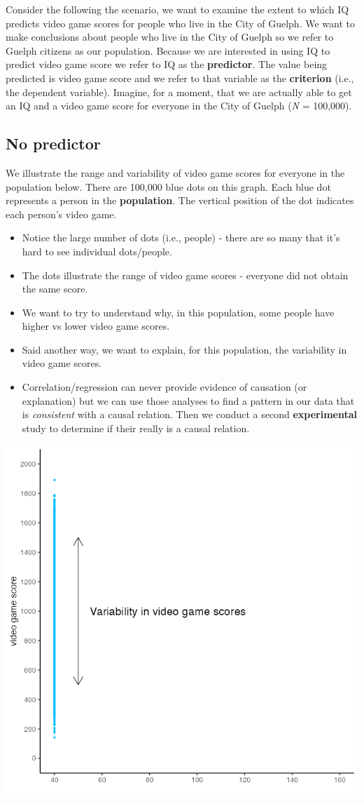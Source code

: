 \documentclass[
]{krantz}
\begin{document}
Consider the following the scenario, we want to examine the extent to which IQ predicts video game scores for people who live in the City of Guelph. We want to make conclusions about people who live in the City of Guelph so we refer to Guelph citizens as our population. Because we are interested in using IQ to predict video game score we refer to IQ as the \textbf{predictor}. The value being predicted is video game score and we refer to that variable as the \textbf{criterion} (i.e., the dependent variable). Imagine, for a moment, that we are actually able to get an IQ and a video game score for everyone in the City of Guelph (\emph{N} = 100,000).

\hypertarget{no-predictor}{%
\subsection{No predictor}\label{no-predictor}}

We illustrate the range and variability of video game scores for everyone in the population below. There are 100,000 blue dots on this graph. Each blue dot represents a person in the \textbf{population}. The vertical position of the dot indicates each person's video game.

\begin{itemize}
\item
  Notice the large number of dots (i.e., people) - there are so many that it's hard to see individual dots/people.
\item
  The dots illustrate the range of video game scores - everyone did not obtain the same score.
\item
  We want to try to understand why, in this population, some people have higher vs lower video game scores.
\item
  Said another way, we want to explain, for this population, the variability in video game scores.
\item
  Correlation/regression can never provide evidence of causation (or explanation) but we can use those analyses to find a pattern in our data that is \emph{consistent} with a causal relation. Then we conduct a second \textbf{experimental} study to determine if their really is a causal relation.
\end{itemize}

\includegraphics[width=0.7\linewidth]{ch_correlation/images/pop_graph_arrow}
\end{document}
